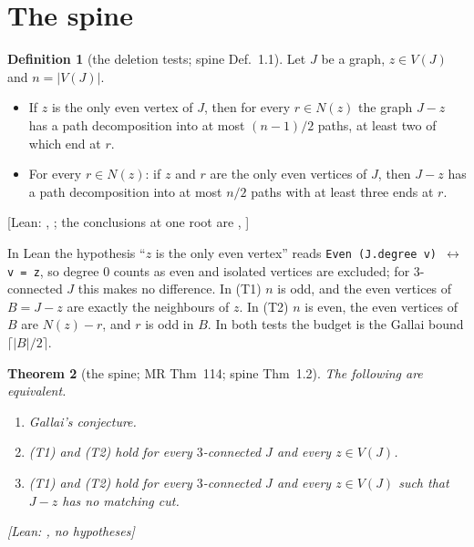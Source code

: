 \documentclass[11pt]{amsart}
\newtheorem{theorem}{Theorem}[section]
\theoremstyle{definition}
\newtheorem{definition}[theorem]{Definition}
\newcommand{\st}[1]{\textsf{\small[#1]}}
\begin{document}
\section{The spine}\label{sec:spine}

\begin{definition}[the deletion tests; spine Def.~1.1]\label{def:tests}
Let $J$ be a graph, $z\in V(J)$ and $n=|V(J)|$.
\begin{itemize}[leftmargin=3em]
\item[(T1)] If $z$ is the only even vertex of $J$, then for every $r\in N(z)$ the graph $J-z$ has a
path decomposition into at most $(n-1)/2$ paths, at least two of which end at $r$.
\item[(T2)] For every $r\in N(z)$: if $z$ and $r$ are the only even vertices of $J$, then $J-z$ has a
path decomposition into at most $n/2$ paths with at least three ends at $r$.
\end{itemize}
\st{Lean: , ; the conclusions at one root are \lean{Test1At},
\lean{Test2At}}
\end{definition}

In Lean the hypothesis ``$z$ is the only even vertex'' reads \texttt{Even (J.degree v) $\leftrightarrow$ v = z},
so degree $0$ counts as even and isolated vertices are excluded; for $3$-connected $J$ this makes no
difference. In (T1) $n$ is odd, and the even vertices of $B=J-z$ are exactly the neighbours of $z$. In (T2) $n$
is even, the even vertices of $B$ are $N(z)-r$, and $r$ is odd in $B$. In both tests the budget is the
Gallai bound $\lceil|B|/2\rceil$.

\begin{theorem}[the spine; MR Thm~114; spine Thm~1.2]\label{thm:spine}
The following are equivalent.
\begin{enumerate}[label=(\roman*)]
\item Gallai's conjecture.
\item (T1) and (T2) hold for every $3$-connected $J$ and every $z\in V(J)$.
\item (T1) and (T2) hold for every $3$-connected $J$ and every $z\in V(J)$ such that $J-z$ has no
matching cut.
\end{enumerate}
\st{Lean: , no hypotheses}
\end{theorem}
\end{document}
